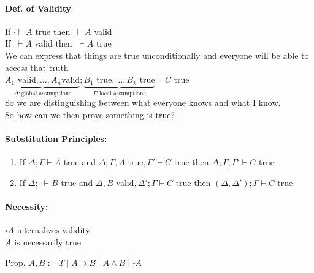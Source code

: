 \documentclass[12 pt]{article}
\begin{document}
       \paragraph{Def. of Validity} If $\cdot \vdash A$ true then $\
       \vdash A$ valid
       \\ If $\ \vdash A$ valid then $\ \vdash A$ true
       \\ We can express that things are true unconditionally and
       everyone will be able to access that truth
       \\ $\underbrace{A_1 \text{ valid}, \ldots, A_n \text{
           valid}}_{\Delta : \text{global assumptions}}; \underbrace{B_1
         \text{ true}, \ldots, B_k \text{ true}}_{\Gamma : \text{local
           assumptions}} \vdash C$ true
       \\ So we are distinguishing between what everyone knows and
       what I know.
       \\ So how can we then prove something is true?
       \begin{prooftree}
       \end{prooftree}
       \begin{prooftree}
       \end{prooftree}
       \paragraph{Substitution Principles:}
       \begin{enumerate}
       \item If $\Delta; \Gamma \vdash A$ true and $\Delta; \Gamma, A$
         true$, \Gamma' \vdash C$ true then $\Delta;\Gamma, \Gamma'
         \vdash C$ true
       \item If $\Delta; \cdot \vdash B$ true and $\Delta, B$
         valid$,\Delta' ; \Gamma \vdash C$ true then $(\Delta,
         \Delta'); \Gamma \vdash C$ true
       \end{enumerate}
       \paragraph{Necessity:} $\square A$ internalizes validity
       \\ $A$ is necessarily true

       Prop. $A, B := T \mid A \supset B \mid A \land B \mid \square
       A$
\end{document}
